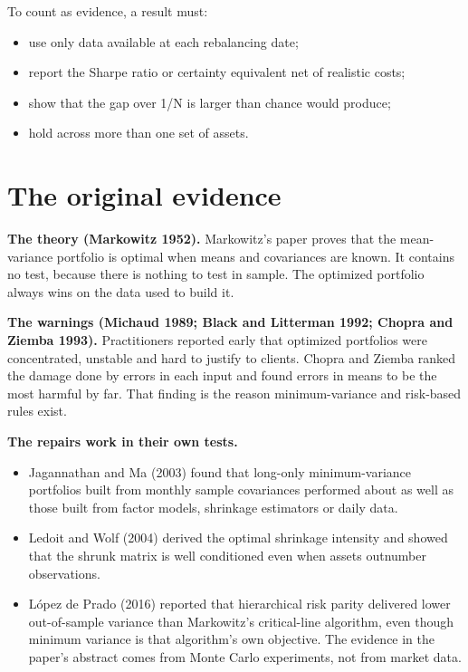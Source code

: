 To count as evidence, a result must:

\begin{itemize}
  \item use only data available at each rebalancing date;
  \item report the Sharpe ratio or certainty equivalent net of realistic costs;
  \item show that the gap over 1/N is larger than chance would produce;
  \item hold across more than one set of assets.
\end{itemize}

\section{The original evidence}
\label{sec:12-evidence}

\textbf{The theory (Markowitz 1952).} Markowitz's paper proves that the mean-variance portfolio is optimal when means and covariances are known. It contains no test, because there is nothing to test in sample. The optimized portfolio always wins on the data used to build it.

\textbf{The warnings (Michaud 1989; Black and Litterman 1992; Chopra and Ziemba 1993).} Practitioners reported early that optimized portfolios were concentrated, unstable and hard to justify to clients. Chopra and Ziemba ranked the damage done by errors in each input and found errors in means to be the most harmful by far. That finding is the reason minimum-variance and risk-based rules exist.

\textbf{The repairs work in their own tests.}

\begin{itemize}
  \item Jagannathan and Ma (2003) found that long-only minimum-variance portfolios built from monthly sample covariances performed about as well as those built from factor models, shrinkage estimators or daily data.
  \item Ledoit and Wolf (2004) derived the optimal shrinkage intensity and showed that the shrunk matrix is well conditioned even when assets outnumber observations.
  \item L\'opez de Prado (2016) reported that hierarchical risk parity delivered lower out-of-sample variance than Markowitz's critical-line algorithm, even though minimum variance is that algorithm's own objective. The evidence in the paper's abstract comes from Monte Carlo experiments, not from market data.
\end{itemize}

